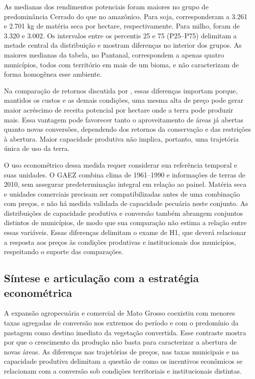 
\FloatBarrier

As medianas dos rendimentos potenciais foram maiores no grupo de predominância Cerrado do que no amazônico. Para soja, corresponderam a 3.261 e 2.701 kg de matéria seca por hectare, respectivamente. Para milho, foram de 3.320 e 3.002. Os intervalos entre os percentis 25 e 75 (P25--P75) delimitam a metade central da distribuição e mostram diferenças no interior dos grupos. As maiores medianas da tabela, no Pantanal, correspondem a apenas quatro municípios, todos com território em mais de um bioma, e não caracterizam de forma homogênea esse ambiente.

Na comparação de retornos discutida por , essas diferenças importam porque, mantidos os custos e as demais condições, uma mesma alta de preço pode gerar maior acréscimo de receita potencial por hectare onde a terra pode produzir mais. Essa vantagem pode favorecer tanto o aproveitamento de áreas já abertas quanto novas conversões, dependendo dos retornos da conservação e das restrições à abertura. Maior capacidade produtiva não implica, portanto, uma trajetória única de uso da terra.

O uso econométrico dessa medida requer considerar sua referência temporal e suas unidades. O GAEZ combina clima de 1961--1990 e informações de terras de 2010, sem assegurar predeterminação integral em relação ao painel. Matéria seca e unidades comerciais precisam ser compatibilizadas antes de uma combinação com preços, e não há medida validada de capacidade pecuária neste conjunto. As distribuições de capacidade produtiva e conversão também abrangem conjuntos distintos de municípios, de modo que sua comparação não estima a relação entre essas variáveis. Essas diferenças delimitam o exame de H1, que deverá relacionar a resposta aos preços às condições produtivas e institucionais dos municípios, respeitando o suporte das comparações.

\subsection{Síntese e articulação com a estratégia econométrica}
\label{descritiva-sintese}

A expansão agropecuária e comercial de Mato Grosso coexistiu com menores taxas agregadas de conversão nos extremos do período e com o predomínio da pastagem como destino imediato da vegetação convertida. Esse contraste mostra por que o crescimento da produção não basta para caracterizar a abertura de novas áreas. As diferenças nas trajetórias de preços, nas taxas municipais e na capacidade produtiva delimitam a questão de como os incentivos econômicos se relacionam com a conversão sob condições territoriais e institucionais distintas.


